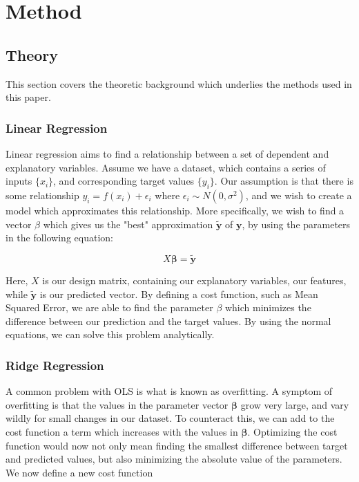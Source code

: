 \documentclass[onecolumn,10pt,cleanfoot]{asme2ej}
\begin{document}
\section{Method}

\subsection{Theory}

This section covers the theoretic background which underlies the methods used in this paper.

\subsubsection{Linear Regression}

Linear regression aims to find a relationship between a set of dependent and explanatory variables. Assume we have a dataset, which contains a series of inputs $\{x_i\}$, and corresponding target values $\{y_i\}$. Our assumption is that there is some relationship $y_i = f(x_i) + \epsilon_i$ where $\epsilon_i \sim N(0,\sigma^2)$, and we wish to create a model which approximates this relationship. More specifically, we wish to find a vector $\beta$ which gives us the "best" approximation $\bm{\tilde{y}}$ of $\bm{y}$, by using the parameters in the following equation:

\begin{equation}
X \bm{\beta} = \bm{\tilde{y}}
\label{first}
\end{equation}

Here, $X$ is our design matrix, containing our explanatory variables, our features, while $\bm{\tilde{y}}$ is our predicted vector. By defining a cost function, such as Mean Squared Error, we are able to find the parameter $\beta$ which minimizes the difference between our prediction and the target values. By using the normal equations, we can solve this problem analytically.

\subsubsection{Ridge Regression}

A common problem with OLS is what is known as overfitting. A symptom of overfitting is that the values in the parameter vector $\bm{\beta}$ grow very large, and vary wildly for small changes in our dataset. To counteract this, we can add to the cost function a term which increases with the values in $\bm{\beta}$. Optimizing the cost function would now not only mean finding the smallest difference between target and predicted values, but also minimizing the absolute value of the parameters. We now define a new cost function
\end{document}
